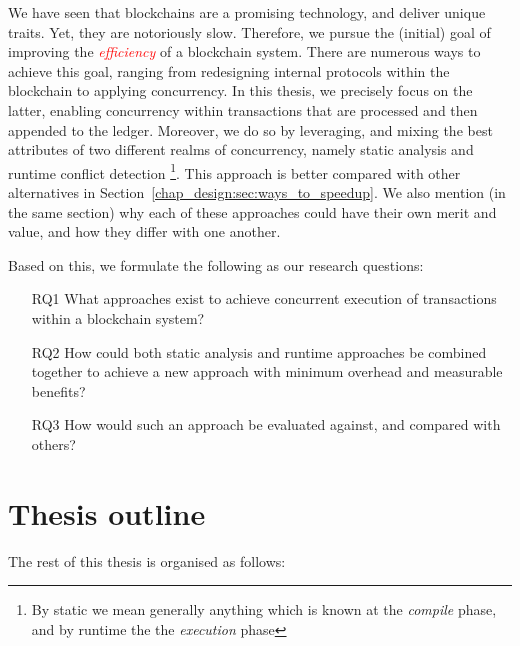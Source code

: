 We have seen that blockchains are a promising technology, and deliver unique traits. Yet, they are notoriously slow. Therefore, we  pursue the (initial) goal of improving
the \textcolor{red}{\textit{efficiency}} of a blockchain system. There are numerous ways to
achieve this goal, ranging from redesigning internal protocols within the blockchain to applying
concurrency. In this thesis, we precisely focus on the latter, enabling concurrency within
transactions that are processed and then appended to the ledger. Moreover, we do so by leveraging,
and mixing the best attributes of two different realms of concurrency, namely static analysis and
runtime conflict detection \footnote{By static we mean generally anything which is known at the
\textit{compile} phase, and by runtime the the \textit{execution} phase}. This approach is better
compared with other alternatives in Section~\ref{chap_design:sec:ways_to_speedup}. We also mention (in
the same section) why each of these approaches could have their own merit and value, and how they
differ with one another.

Based on this, we formulate the following as our research questions:

 \begin{enumerate}
     \item [RQ1] What approaches exist to achieve concurrent execution of transactions within a blockchain
     system?
	 \item [RQ2] How could both static analysis and runtime approaches be combined together to achieve a new approach with minimum overhead and measurable benefits?  
	 \item [RQ3] How would such an approach be evaluated against, and compared with others?
 \end{enumerate}

\section{Thesis outline}
The rest of this thesis is organised as follows: 


